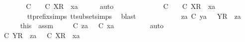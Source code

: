 \begin{isabellebody}
\ \ \ \ \isamarkupfalse%
\ \isamarkupfalse%
\ {\isachardoublequoteopen}{\isasymexists}{\isasymrho}{\isacharprime}{\isachardot}\ {\isasymrho}{\isacharprime}\ {\isasymsubseteq}\isactrlsub C\ {\isasymsigma}{\isacharprime}\ {\isasymand}\ {\isasymrho}{\isacharprime}\ {\isasymle}\isactrlsub C\ {\isacharbrackleft}X{\isacharbrackright}\isactrlsub R\ {\isacharhash}\ xa{\isachardoublequoteclose}\isanewline
\ \ \ \ \isamarkupfalse%
\ auto\isanewline
\ \ \ \ \ \ \isamarkupfalse%
\ {\isachardoublequoteopen}{\isasymsigma}{\isacharprime}\ {\isacharequal}\ {\isacharbrackleft}{\isacharbrackright}\ {\isasymLongrightarrow}\ {\isasymexists}{\isasymrho}{\isacharprime}{\isachardot}\ {\isasymrho}{\isacharprime}\ {\isasymsubseteq}\isactrlsub C\ {\isacharbrackleft}{\isacharbrackright}\ {\isasymand}\ {\isasymrho}{\isacharprime}\ {\isasymle}\isactrlsub C\ {\isacharbrackleft}X{\isacharbrackright}\isactrlsub R\ {\isacharhash}\ xa{\isachardoublequoteclose}\isanewline
\ \ \ \ \ \ \ \ \isamarkupfalse%
\ tt{\isacharunderscore}prefix{\isachardot}simps{\isacharparenleft}{}{\isacharparenright}\ tt{\isacharunderscore}subset{\isachardot}simps{\isacharparenleft}{}{\isacharparenright}\ \isamarkupfalse%
\ blast\isanewline
\ \ \ \ \isamarkupfalse%
\isanewline
\ \ \ \ \ \ \isamarkupfalse%
\ {\isachardoublequoteopen}za\ {\isasymle}\isactrlsub C\ ya{\isachardoublequoteclose}\ {\isachardoublequoteopen}{\isasymsigma}{\isacharprime}\ {\isacharequal}\ {\isacharbrackleft}Y{\isacharbrackright}\isactrlsub R\ {\isacharhash}\ za{\isachardoublequoteclose}\isanewline
\ \ \ \ \ \ \isamarkupfalse%
\ this\ \ assm{}\ \isamarkupfalse%
\ {\isasymrho}{\isacharprime}\ \ {\isachardoublequoteopen}{\isasymrho}{\isacharprime}\ {\isasymsubseteq}\isactrlsub C\ za\ {\isasymand}\ {\isasymrho}{\isacharprime}\ {\isasymle}\isactrlsub C\ xa{\isachardoublequoteclose}\isanewline
\ \ \ \ \ \ \ \ \isamarkupfalse%
\ auto\isanewline
\ \ \ \ \ \ \isamarkupfalse%
\ \isamarkupfalse%
\ {\isachardoublequoteopen}{\isasymexists}{\isasymrho}{\isacharprime}{\isachardot}\ {\isasymrho}{\isacharprime}\ {\isasymsubseteq}\isactrlsub C\ {\isacharbrackleft}Y{\isacharbrackright}\isactrlsub R\ {\isacharhash}\ za\ {\isasymand}\ {\isasymrho}{\isacharprime}\ {\isasymle}\isactrlsub C\ {\isacharbrackleft}X{\isacharbrackright}\isactrlsub R\ {\isacharhash}\ xa{\isachardoublequoteclose}\isanewline

\end{isabellebody}
